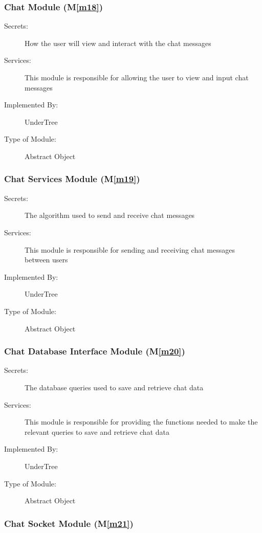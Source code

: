 \documentclass[12pt, titlepage]{article}
\newcommand{\mref}[1]{M\ref{#1}}
\begin{document}
	\subsubsection{Chat Module (\mref{m18})}
	
	\begin{description}
		\item[Secrets:] How the user will view and interact with the chat messages
		\item[Services:] This module is responsible for allowing the user to view and input chat messages
		\item[Implemented By:] UnderTree
		\item[Type of Module:] Abstract Object
	\end{description}
	
	\subsubsection{Chat Services Module (\mref{m19})}
	
	\begin{description}
		\item[Secrets:] The algorithm used to send and receive chat messages
		\item[Services:] This module is responsible for sending and receiving chat messages between users
		\item[Implemented By:] UnderTree
		\item[Type of Module:] Abstract Object
	\end{description}
	
	\subsubsection{Chat Database Interface Module (\mref{m20})}
	
	\begin{description}
		\item[Secrets:] The database queries used to save and retrieve chat data
		\item[Services:] This module is responsible for providing the functions needed to make the relevant queries to save and retrieve chat data
		\item[Implemented By:] UnderTree
		\item[Type of Module:] Abstract Object
	\end{description}
	
	\subsubsection{Chat Socket Module (\mref{m21})}
	
\end{document}
